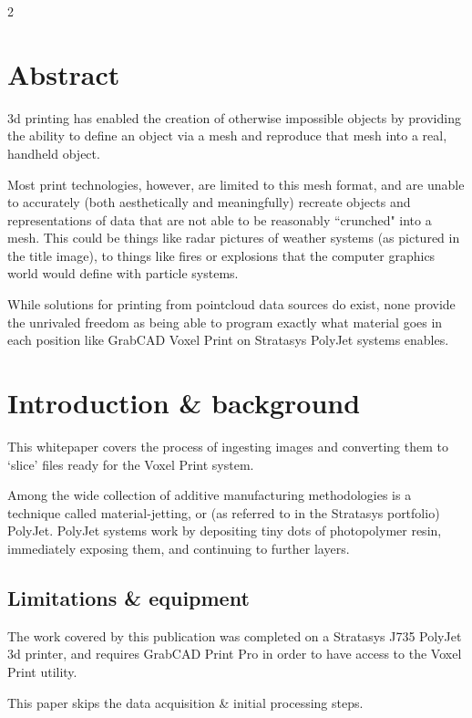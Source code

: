 \documentclass{article}
\begin{document}
\begin{multicols}{2}

\section{Abstract}

3d printing has enabled the creation of otherwise impossible objects by providing the ability to define an object via a mesh and reproduce that mesh into a real, handheld object.

Most print technologies, however, are limited to this mesh format, and are unable to accurately (both aesthetically and meaningfully) recreate objects and representations of data that are not able to be reasonably ``crunched" into a mesh. This could be things like radar pictures of weather systems (as pictured in the title image), to things like fires or explosions that the computer graphics world would define with particle systems.

While solutions for printing from pointcloud data sources do exist, none provide the unrivaled freedom as being able to program exactly what material goes in each position like GrabCAD Voxel Print on Stratasys PolyJet systems enables.

\section{Introduction \& background}

This whitepaper covers the process of ingesting images and converting them to `slice' files ready for the Voxel Print system.

Among the wide collection of additive manufacturing methodologies is a technique called material-jetting, or (as referred to in the Stratasys portfolio) PolyJet. PolyJet systems work by depositing tiny dots of photopolymer resin, immediately exposing them, and continuing to further layers. 

\subsection{Limitations \& equipment}

The work covered by this publication was completed on a Stratasys J735 PolyJet 3d printer, and requires GrabCAD Print Pro in order to have access to the Voxel Print utility. 

This paper skips the data acquisition \& initial processing steps.


\end{multicols}
\end{document}
